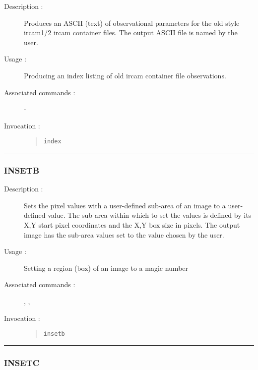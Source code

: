 \begin{description}

\item[Description :] Produces an ASCII (text) of observational
parameters for the old style {\sc ircam1/2} {\sc ircam} container
files.  The output ASCII file is named by the user.

\item[Usage :] Producing an index listing of old {\sc ircam} container file
observations.
\item[Associated commands :] -
\item[Invocation :]

\begin{quote}{\tt  index }\end{quote}

\end{description}

\hrule 
\subsubsection*{\label{INSETB}INSETB}

\begin{description}

\item[Description :] Sets the pixel values with a user-defined sub-area
of an image to a user-defined value.  The sub-area within which to set
the values is defined by its X,Y start pixel coordinates and the X,Y
box size in pixels.  The output image has the sub-area values set to
the value chosen by the user.

\item[Usage :] Setting a region (box) of an image to a magic number

\item[Associated commands :] {\tt {}}, 
{\tt {}}, {\tt {}}

\item[Invocation :]

\begin{quote}{\tt  insetb }\end{quote}

\end{description}

\hrule 
\subsubsection*{\label{INSETC}INSETC}

